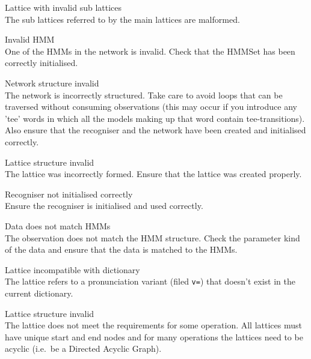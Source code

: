 \begin{itemize}
\begin{itemize}
    Lattice with invalid sub lattices\\
        The sub lattices referred to by the main lattices are
        malformed.

\end{itemize}



\begin{itemize}
 Invalid HMM\\
        One of the HMMs in the network is invalid.  Check that the HMMSet
        has been correctly initialised.

    Network structure invalid\\
        The network is incorrectly structured.  Take care to avoid loops
        that can be traversed without consuming observations (this may occur 
        if you introduce any 'tee' words in which all the models making up that
        word contain tee-transitions).  Also ensure that the recogniser and
        the network have been created and initialised correctly.

    Lattice structure invalid\\
        The lattice was incorrectly formed.  Ensure that the lattice was
        created properly.

 Recogniser not initialised correctly\\
        Ensure the recogniser is initialised and used correctly.

    Data does not match HMMs\\
        The observation does not match the HMM structure.  Check the parameter
        kind of the data and ensure that the data is matched to the HMMs.

\end{itemize}



\begin{itemize}

    Lattice incompatible with dictionary\\
        The lattice refers to a pronunciation variant (filed
        \texttt{v=}) that doesn't exist in the current dictionary.

    Lattice structure invalid\\
        The lattice does not meet the requirements for some operation.
        All lattices must have unique start and end nodes and for many
        operations the lattices need to be acyclic (i.e.\ be a
        Directed Acyclic Graph).


\end{itemize}
\end{itemize}
